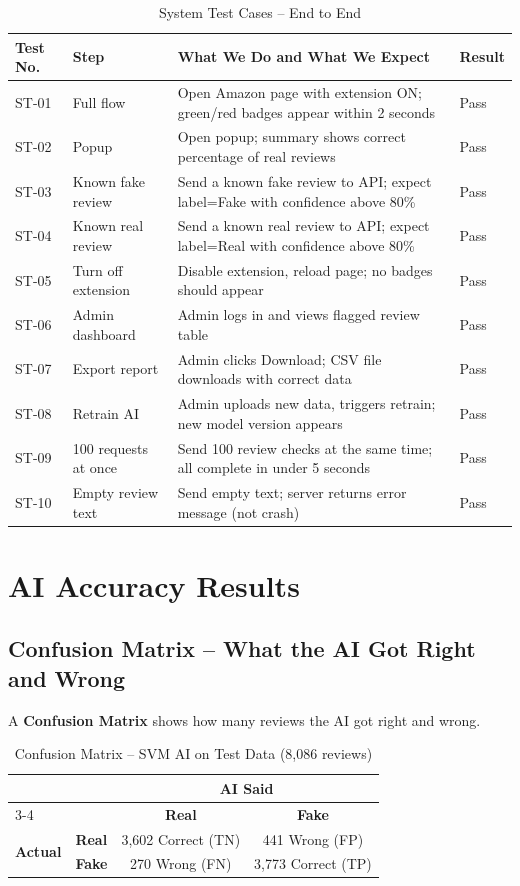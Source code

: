 \documentclass[10pt, a4paper]{report}
\begin{document}
\begin{table}[H]
\centering
\caption{System Test Cases -- End to End}
\begin{tabularx}{\textwidth}{llXl}
\toprule
\textbf{Test No.} & \textbf{Step} & \textbf{What We Do and What We Expect} & \textbf{Result} \\
\midrule
ST-01 & Full flow & Open Amazon page with extension ON; green/red badges appear within 2 seconds & Pass \\
ST-02 & Popup & Open popup; summary shows correct percentage of real reviews & Pass \\
ST-03 & Known fake review & Send a known fake review to API; expect label=Fake with confidence above 80\% & Pass \\
ST-04 & Known real review & Send a known real review to API; expect label=Real with confidence above 80\% & Pass \\
ST-05 & Turn off extension & Disable extension, reload page; no badges should appear & Pass \\
ST-06 & Admin dashboard & Admin logs in and views flagged review table & Pass \\
ST-07 & Export report & Admin clicks Download; CSV file downloads with correct data & Pass \\
ST-08 & Retrain AI & Admin uploads new data, triggers retrain; new model version appears & Pass \\
ST-09 & 100 requests at once & Send 100 review checks at the same time; all complete in under 5 seconds & Pass \\
ST-10 & Empty review text & Send empty text; server returns error message (not crash) & Pass \\
\bottomrule
\end{tabularx}
\end{table}

\section{AI Accuracy Results}

\subsection{Confusion Matrix -- What the AI Got Right and Wrong}

A \textbf{Confusion Matrix} shows how many reviews the AI got right and wrong.

\begin{table}[H]
\centering
\caption{Confusion Matrix -- SVM AI on Test Data (8,086 reviews)}
\begin{tabular}{llcc}
\toprule
& & \multicolumn{2}{c}{\textbf{AI Said}} \\
\cmidrule{3-4}
& & \textbf{Real} & \textbf{Fake} \\
\midrule
\multirow{2}{*}{\textbf{Actual}} & \textbf{Real} & 3,602 Correct (TN) & 441 Wrong (FP) \\
& \textbf{Fake} & 270 Wrong (FN) & 3,773 Correct (TP) \\
\bottomrule
\end{tabular}
\end{table}
\end{document}
